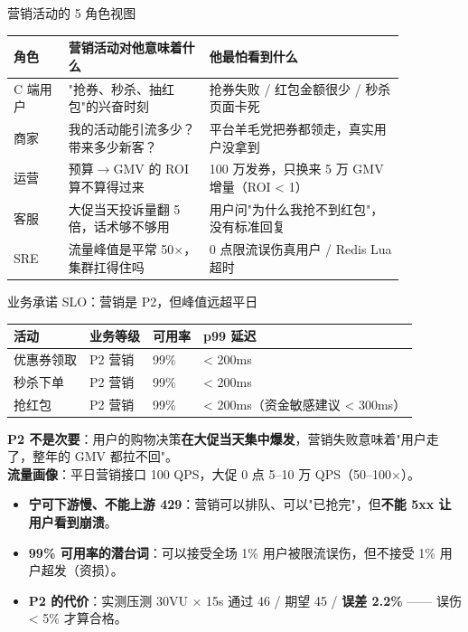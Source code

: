 \documentclass[aspectratio=169,11pt]{beamer}
\begin{document}
\begin{frame}[shrink]{营销活动的 5 角色视图}
\scriptsize
\begin{tabular}{@{}lp{0.36\linewidth}p{0.50\linewidth}@{}}
\toprule
角色 & 营销活动对他意味着什么 & 他最怕看到什么 \\
\midrule
C 端用户   & "抢券、秒杀、抽红包"的兴奋时刻 & 抢券失败 / 红包金额很少 / 秒杀页面卡死 \\
商家       & 我的活动能引流多少？带来多少新客？ & 平台羊毛党把券都领走，真实用户没拿到 \\
运营       & 预算$\to$GMV 的 ROI 算不算得过来 & 100 万发券，只换来 5 万 GMV 增量（ROI < 1） \\
客服       & 大促当天投诉量翻 5 倍，话术够不够用 & 用户问"为什么我抢不到红包"，没有标准回复 \\
SRE        & 流量峰值是平常 50×，集群扛得住吗 & 0 点限流误伤真用户 / Redis Lua 超时 \\
\bottomrule
\end{tabular}
\smallskip
{}
\end{frame}

\begin{frame}[shrink]{业务承诺 SLO：营销是 P2，但峰值远超平日}
\begin{tabular}{@{}llll@{}}
\toprule
活动 & 业务等级 & 可用率 & p99 延迟 \\
\midrule
优惠券领取 & P2 营销 & 99\% & < 200ms \\
秒杀下单   & P2 营销 & 99\% & < 200ms \\
抢红包     & P2 营销 & 99\% & < 200ms（资金敏感建议 < 300ms） \\
\bottomrule
\end{tabular}
\vspace{2mm}
\small \textbf{P2 不是次要}：用户的购物决策\textbf{在大促当天集中爆发}，营销失败意味着"用户走了，整年的 GMV 都拉不回"。\\
\textbf{流量画像}：平日营销接口 100 QPS，大促 0 点 5--10 万 QPS（50--100×）。
\vspace{2mm}
\begin{itemize}
  \item \textbf{宁可下游慢、不能上游 429}：营销可以排队、可以"已抢完"，但\textbf{不能 5xx 让用户看到崩溃}。
  \item \textbf{99\% 可用率的潜台词}：可以接受全场 1\% 用户被限流误伤，但不接受 1\% 用户超发（资损）。
  \item \textbf{P2 的代价}：实测压测 30VU × 15s 通过 46 / 期望 45 / \textbf{误差 2.2\%} —— 误伤 < 5\% 才算合格。
\end{itemize}
\end{frame}
\end{document}
